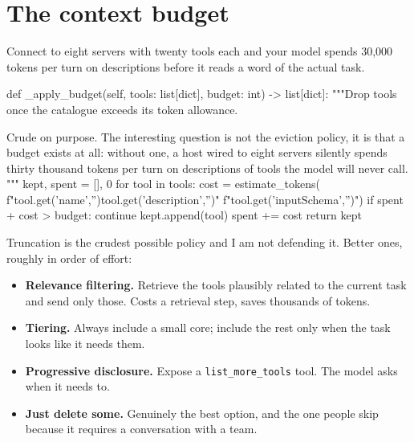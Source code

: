\section{The context budget}


Connect to eight servers with twenty tools each and your model spends 30,000
tokens per turn on descriptions before it reads a word of the actual task.

\begin{py}
def _apply_budget(self, tools: list[dict], budget: int) -> list[dict]:
    """Drop tools once the catalogue exceeds its token allowance.

    Crude on purpose. The interesting question is not the eviction policy,
    it is that a budget exists at all: without one, a host wired to eight
    servers silently spends thirty thousand tokens per turn on descriptions
    of tools the model will never call.
    """
    kept, spent = [], 0
    for tool in tools:
        cost = estimate_tokens(
            f"{tool.get('name','')}{tool.get('description','')}"
            f"{tool.get('inputSchema','')}")
        if spent + cost > budget:
            continue
        kept.append(tool)
        spent += cost
    return kept
\end{py}

Truncation is the crudest possible policy and I am not defending it. Better ones,
roughly in order of effort:

\begin{itemize}[leftmargin=1.6em, itemsep=3pt]
\item \textbf{Relevance filtering.} Retrieve the tools plausibly related to the
current task and send only those. Costs a retrieval step, saves thousands of
tokens.
\item \textbf{Tiering.} Always include a small core; include the rest only when
the task looks like it needs them.
\item \textbf{Progressive disclosure.} Expose a \texttt{list\_more\_tools} tool.
The model asks when it needs to.
\item \textbf{Just delete some.} Genuinely the best option, and the one people
skip because it requires a conversation with a team.
\end{itemize}


